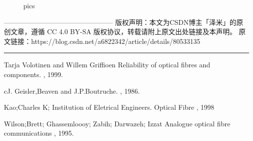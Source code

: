 \documentclass[a4paper]{article}
\begin{document}
\begin{figure}[htb]
\centering
{}%
%
\centering
\caption{ pics}
\end{figure}
————————————————
版权声明：本文为CSDN博主「泽米」的原创文章，遵循 CC 4.0 BY-SA 版权协议，转载请附上原文出处链接及本声明。
原文链接：https://blog.csdn.net/a6822342/article/details/80533135


\vspace{6cm}
\color{black}
\noindent\rule[0.25\baselineskip]{\textwidth}{1pt}
%




\begin{thebibliography}{10}


Tarja Volotinen and Willem Griffioen
\newblock Reliability of optical fibres and components.
, 1999.



cJ. Geisler,Beaven and J.P.Boutruche.
\newblock 
{}, 1986.

Kao;Charles K; Institution of Eletrical Engineers.
\newblock Optical Fibre
, 1998

Wilson;Brett; Ghassemloooy; Zabih; Darwazeh; Izzat
\newblock Analogue optical fibre communications
, 1995.


\end{thebibliography}
\end{document}
